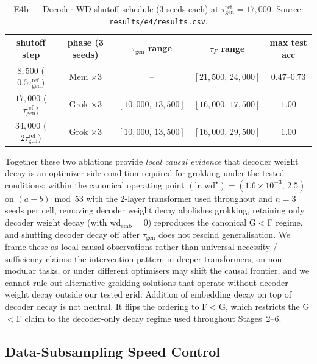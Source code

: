 \documentclass{article}
\newcommand{\taug}{\tau_{\mathrm{gen}}}
\newcommand{\tauf}{\tau_{F}}
\begin{document}
\begin{table}[tbp]
  \centering
  \caption{E4b --- Decoder-WD shutoff schedule (3 seeds each) at
    $\taug^{\mathrm{ref}}{=}17{,}000$.
    Source: \texttt{results/e4/results.csv}.}
  \label{tab:e4_schedule}
  \small
  \begin{tabular}{ccccc}
    \toprule
    shutoff step & phase (3 seeds) & $\taug$ range & $\tauf$ range & max test acc \\
    \midrule
    $8{,}500$ ($0.5\taug^{\mathrm{ref}}$)  & Mem $\times 3$  & --                      & $[21{,}500,\,24{,}000]$ & $0.47$--$0.73$ \\
    $17{,}000$ ($\taug^{\mathrm{ref}}$)    & Grok $\times 3$ & $[10{,}000,\,13{,}500]$ & $[16{,}000,\,17{,}500]$ & $1.00$ \\
    $34{,}000$ ($2\taug^{\mathrm{ref}}$)   & Grok $\times 3$ & $[10{,}000,\,13{,}500]$ & $[16{,}000,\,29{,}500]$ & $1.00$ \\
    \bottomrule
  \end{tabular}
\end{table}

Together these two ablations provide \emph{local causal evidence}
that decoder weight decay is an optimizer-side condition required
for grokking under the tested conditions: within the canonical
operating point
$(\mathrm{lr},\mathrm{wd}^{\star}){=}(1.6{\times}10^{-3},\,2.5)$
on $(a+b)\bmod 53$ with the 2-layer transformer used throughout
and $n{=}3$ seeds per cell, removing decoder weight decay
abolishes grokking, retaining only decoder weight decay (with
$\mathrm{wd}_{\mathrm{emb}}{=}0$) reproduces the canonical
G$<$F regime, and shutting decoder decay off after $\taug$
does not rescind generalisation.
We frame these as local causal observations rather than universal
necessity / sufficiency claims: the intervention pattern in
deeper transformers, on non-modular tasks, or under different
optimisers may shift the causal frontier, and we cannot rule out
alternative grokking solutions that operate without decoder weight
decay outside our tested grid.
Addition of embedding decay on top of decoder decay is not neutral.
It flips the ordering to F$<$G, which restricts the G$<$F claim to
the decoder-only decay regime used throughout Stages~2--6.

\subsection{Data-Subsampling Speed Control}
\label{sec:e5_subsample}
\end{document}
